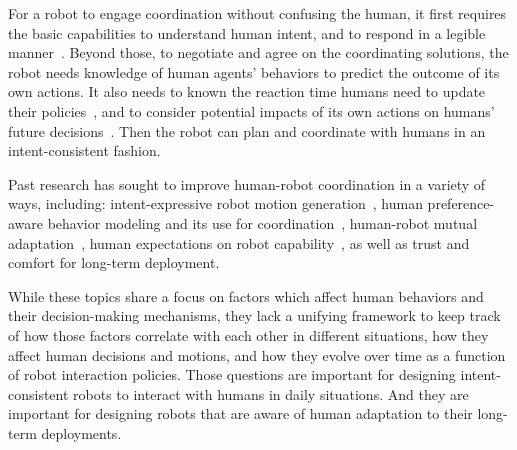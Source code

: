 \documentclass[letterpaper, 10 pt, conference]{ieeeconf}  %
\begin{document}
For a robot to engage coordination without confusing the human, it first 
requires the basic capabilities to understand human intent, and to respond in a 
legible manner~\cite{dragan2013legibility}. Beyond those, to negotiate and agree on the coordinating 
solutions, the robot needs knowledge of human agents' behaviors to 
predict the outcome of its own actions. 
It also needs to known the reaction time humans need 
to update their policies~\cite{shah2011improved}, and to consider potential 
impacts of its own actions on humans' future 
decisions~\cite{fujiwara2015non,foerster2017learning}. Then the 
robot can plan and coordinate with humans in an intent-consistent fashion. 

Past research has sought to improve human-robot coordination in a variety of 
ways, including: intent-expressive robot 
motion generation~\cite{dragan2013legibility,lichtenthaler2012influence}, human 
preference-aware behavior modeling and its 
use for coordination~\cite{gombolay2015coordination,dorsa2017active}, human-robot mutual 
adaptation~\cite{nikolaidis2013human,nikolaidis2016formalizing}, human 
expectations on robot capability~\cite{cha2015perceived,kwon2016human}, as well as trust and comfort for long-term 
deployment\cite{yang2017evaluating}. 

While these topics share a focus on factors which affect human behaviors and 
their decision-making mechanisms, 
they lack a unifying framework to keep track of how those factors correlate with 
each other in different situations, how they affect human 
decisions and motions, and 
how they evolve over time as a function of robot interaction policies. 
Those questions are important for designing intent-consistent robots to 
interact with humans in daily situations. And they are important for 
designing 
robots that are aware of human 
adaptation to their long-term deployments.  
\end{document}
